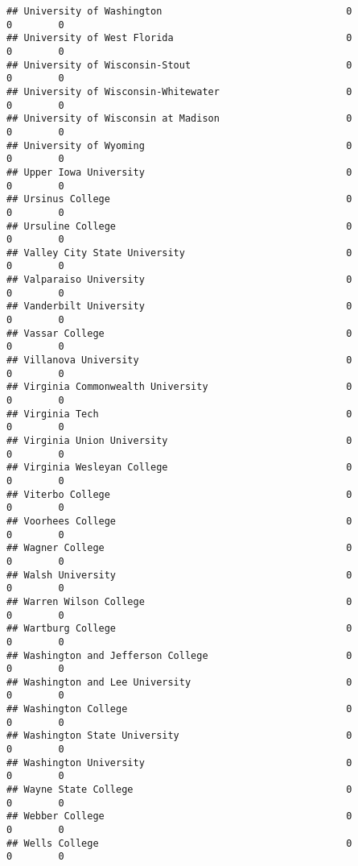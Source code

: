 \documentclass[
]{article}
\begin{document}
\begin{verbatim}
## University of Washington                                0           0        0
## University of West Florida                              0           0        0
## University of Wisconsin-Stout                           0           0        0
## University of Wisconsin-Whitewater                      0           0        0
## University of Wisconsin at Madison                      0           0        0
## University of Wyoming                                   0           0        0
## Upper Iowa University                                   0           0        0
## Ursinus College                                         0           0        0
## Ursuline College                                        0           0        0
## Valley City State University                            0           0        0
## Valparaiso University                                   0           0        0
## Vanderbilt University                                   0           0        0
## Vassar College                                          0           0        0
## Villanova University                                    0           0        0
## Virginia Commonwealth University                        0           0        0
## Virginia Tech                                           0           0        0
## Virginia Union University                               0           0        0
## Virginia Wesleyan College                               0           0        0
## Viterbo College                                         0           0        0
## Voorhees College                                        0           0        0
## Wagner College                                          0           0        0
## Walsh University                                        0           0        0
## Warren Wilson College                                   0           0        0
## Wartburg College                                        0           0        0
## Washington and Jefferson College                        0           0        0
## Washington and Lee University                           0           0        0
## Washington College                                      0           0        0
## Washington State University                             0           0        0
## Washington University                                   0           0        0
## Wayne State College                                     0           0        0
## Webber College                                          0           0        0
## Wells College                                           0           0        0

\end{verbatim}
\end{document}
